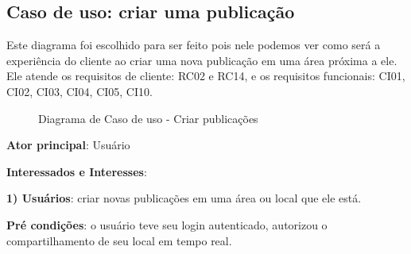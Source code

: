 \documentclass[12pt]{article}
\begin{document}
\vfill%
\pagebreak%

\subsection{Caso de uso: criar uma publicação}
Este diagrama foi escolhido para ser feito pois nele podemos ver como será a experiência do cliente ao criar uma nova publicação em uma área próxima a ele. Ele atende os requisitos de cliente: RC02 e RC14, e os requisitos funcionais: CI01, CI02, CI03, CI04, CI05, CI10.

  \begin{figure}[!htb]
    \caption{\label{fig:diagUseCase04} Diagrama de Caso de uso - Criar publicações}
  \end{figure}

\textbf{Ator principal}: Usuário

\textbf{Interessados e Interesses}:

\textbf{1) Usuários}: criar novas publicações em uma área ou local que ele está.

\textbf{Pré condições}: o usuário teve seu login autenticado, autorizou o compartilhamento de seu local em tempo real.
\end{document}
